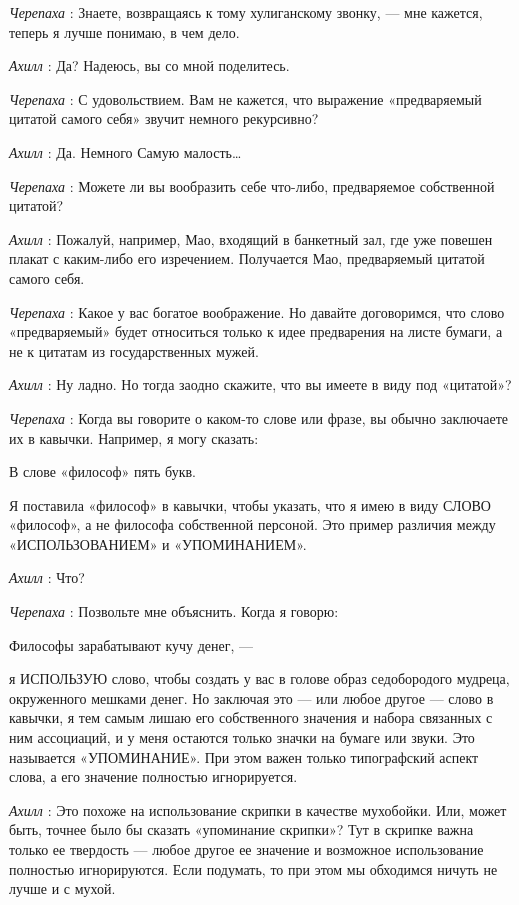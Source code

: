 \documentclass[../main.tex]{subfiles}
\begin{document}
\begin{dialogue}
\emph{Черепаха} : Знаете, возвращаясь к тому хулиганскому звонку, --- мне кажется, теперь я лучше понимаю, в чем дело.

\emph{Ахилл} : Да? Надеюсь, вы со мной поделитесь.

\emph{Черепаха} : С удовольствием. Вам не кажется, что выражение «предваряемый цитатой самого себя» звучит немного рекурсивно?

\emph{Ахилл} : Да. Немного Самую малость\ldots{}

\emph{Черепаха} : Можете ли вы вообразить себе что-либо, предваряемое собственной цитатой?

\emph{Ахилл} : Пожалуй, например, Мао, входящий в банкетный зал, где уже повешен плакат с каким-либо его изречением. Получается Мао, предваряемый цитатой самого себя.

\emph{Черепаха} : Какое у вас богатое воображение. Но давайте договоримся, что слово «предваряемый» будет относиться только к идее предварения на листе бумаги, а не к цитатам из государственных мужей.

\emph{Ахилл} : Ну ладно. Но тогда заодно скажите, что вы имеете в виду под «цитатой»?

\emph{Черепаха} : Когда вы говорите о каком-то слове или фразе, вы обычно заключаете их в кавычки. Например, я могу сказать:

В слове «философ» пять букв.

Я поставила «философ» в кавычки, чтобы указать, что я имею в виду СЛОВО «философ», а не философа собственной персоной. Это пример различия между «ИСПОЛЬЗОВАНИЕМ» и «УПОМИНАНИЕМ».

\emph{Ахилл} : Что?

\emph{Черепаха} : Позвольте мне объяснить. Когда я говорю:

Философы зарабатывают кучу денег, ---

я ИСПОЛЬЗУЮ слово, чтобы создать у вас в голове образ седобородого мудреца, окруженного мешками денег. Но заключая это --- или любое другое --- слово в кавычки, я тем самым лишаю его собственного значения и набора связанных с ним ассоциаций, и у меня остаются только значки на бумаге или звуки. Это называется «УПОМИНАНИЕ». При этом важен только типографский аспект слова, а его значение полностью игнорируется.

\emph{Ахилл} : Это похоже на использование скрипки в качестве мухобойки. Или, может быть, точнее было бы сказать «упоминание скрипки»? Тут в скрипке важна только ее твердость --- любое другое ее значение и возможное использование полностью игнорируются. Если подумать, то при этом мы обходимся ничуть не лучше и с мухой.


\end{dialogue}
\end{document}
